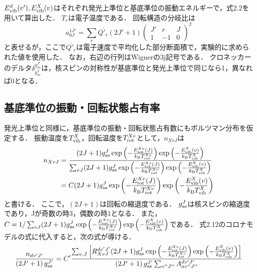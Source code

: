 $E^d_{\rm vib} (v'), E^X_{\rm vib} (v)$はそれぞれ発光上準位と基底準位の振動エネルギーで，式2.2を用いて算出した．
$T_{e}$は電子温度である．
回転構造の分岐比は
\begin{equation}
    a^{1J'}_{0J} = \sum_r \overline{Q'_{r}} (2J'+1) \left( \begin{array}{ccc} J' & r & J \\ 1 & -1 & 0 \end{array} \right)^2
\end{equation}
と表せる\cite{kyokaisou}が，ここで$\overline{Q'_{r}}$は電子速度で平均化した部分断面積で，実験的に求められた値\cite{senkusya}を使用した．
なお，右辺の行列はWignerの3j記号である．
クロネッカーのデルタ$\delta^{g^{J'}_{as}}_{g^J_{as}}$は，核スピンの対称性が基底準位と発光上準位で同じなら1，異なれば0となる．

\subsection{基底準位の振動・回転状態占有率}
発光上準位と同様に，基底準位の振動・回転状態占有数にもボルツマン分布を仮定する．
振動温度を$T^X_{\rm vib}$，回転温度を$T^{Xv}_{\rm rot}$として，$n_{XvJ}$は
\begin{equation}
\begin{split}
    n_{XvJ} &= \frac{ (2J+1) g^J_{\rm as} \exp \left( - \frac{E^{Xv}_{\rm rot}(J)}{k_{\rm B} T^{Xv}_{\rm rot}} \right) \exp \left( - \frac{E^{X}_{\rm vib}(v)}{k_{\rm B} T^{X}_{\rm vib}} \right) }{\sum_{vJ} (2J+1) g^J_{\rm as} \exp \left( - \frac{E^{Xv}_{\rm rot}(J)}{k_{\rm B} T^{Xv}_{\rm rot}} \right) \exp \left( - \frac{E^{X}_{\rm vib}(v)}{k_{\rm B} T^{X}_{\rm vib}} \right)}\\
    &= C (2J+1) g^J_{\rm as} \exp \left( - \frac{E^{Xv}_{\rm rot}(J)}{k_{\rm B} T^{Xv}_{\rm rot}} \right) \exp \left( - \frac{E^{X}_{\rm vib}(v)}{k_{\rm B} T^{X}_{\rm vib}} \right)
\end{split}
\end{equation}
と書ける．
ここで，$(2J+1)$は回転の縮退度である．
$g^J_{\rm as}$は核スピンの縮退度であり，Jが奇数の時3，偶数の時1となる．
また，$C = 1 / \sum_{vJ} (2J+1) g^J_{\rm as} \exp \left( - \frac{E^{Xv}_{\rm rot}(J)}{k_{\rm B} T^{Xv}_{\rm rot}} \right) \exp \left( - \frac{E^{X}_{\rm vib}(v)}{k_{\rm B} T^{X}_{\rm vib}} \right)$である．
式2.12のコロナモデルの式に代入すると，次の式が導ける．
\begin{equation}
    \frac{n_{dv'J'}}{\left( 2J'+1 \right) g^{J'}_{\rm as}} = C' \frac{ \sum_{v, J} \left[ R^{dv'J'}_{XvJ} (2J+1) g^J_{\rm as} \exp \left( - \frac{E^{Xv}_{\rm rot}(J)}{k_{\rm B} T^{Xv}_{\rm rot}} \right) \exp \left( - \frac{E^{X}_{\rm vib}(v)}{k_{\rm B} T^{X}_{\rm vib}} \right) \right] } {\left( 2J'+1 \right) g^{J'}_{\rm as} \sum_{v''J''} A^{dv'J'}_{av''J''} }
\end{equation}
